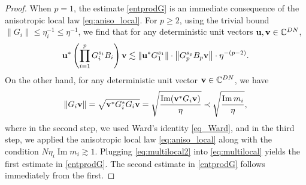\documentclass[10pt,reqno]{amsart}
\numberwithin{equation}{section}
\numberwithin{figure}{section}
\theoremstyle{plain} %
\theoremstyle{definition} %
\newcommand{\C}{\mathbb{C}}
\renewcommand{\geq}{\ge}
\newcommand{\pa}[1]{\left({#1}\right)}
\newcommand{\norma}[1]{\left\lVert #1 \right\rVert}
\DeclareMathOperator{\im}{\mathrm{Im}}
\newcommand{\bu}{{\bf{u}}}
\newcommand{\bv}{{\bf{v}}}
\numberwithin{equation}{section}
\begin{document}
\begin{proof}
    When $p=1$, the estimate \eqref{entprodG} is an immediate consequence of the anisotropic local law \eqref{eq:aniso_local}. For $p\geq 2$, using the trivial bound $\|G_i\|\le \eta_i^{-1}\le \eta^{-1}$, we find that for any deterministic unit vectors $\bu,\bv\in \C^{DN}$, 
    \begin{equation}\label{eq:multilocal}
        \begin{aligned}
            \bu^*\pa{\prod_{i=1}^p G_i^{s_i} B_i}\bv\lesssim \norma{\bu^*G_1^{s_1}}\cdot\norma{G_p^{s_p}B_p\bv}\cdot \eta^{-\pa{p-2}}.
        \end{aligned}
    \end{equation}
On the other hand, for any deterministic unit vector $\bv\in \C^{DN}$, we have
    \begin{equation}\label{eq:multilocal2}
        \begin{aligned}            \norma{G_i\bv}=\sqrt{\bv^*G_i^*G_i\bv}=\sqrt{\frac{\im (\bv^* G_i\bv)}{\eta}}\prec \sqrt{\frac{\im m_i}{\eta}},
        \end{aligned}
    \end{equation}
    where in the second step, we used Ward's identity \eqref{eq_Ward}, and in the third step, we applied the anisotropic local law \eqref{eq:aniso_local} along with the condition $N\eta_i\im m_i\gtrsim 1$. Plugging \eqref{eq:multilocal2} into \eqref{eq:multilocal} yields the first estimate in \eqref{entprodG}. The second estimate in \eqref{entprodG} follows immediately from the first.
    
    

\end{proof}
\end{document}
